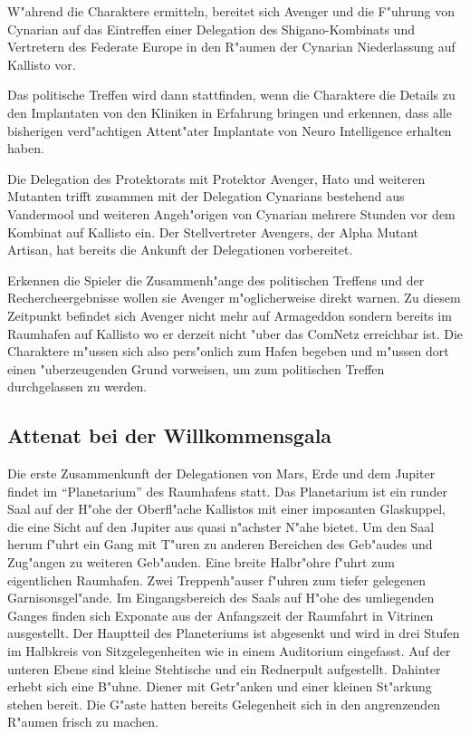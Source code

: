 W"ahrend die Charaktere ermitteln, bereitet sich Avenger und die F"uhrung von Cynarian auf das Eintreffen einer Delegation des Shigano-Kombinats und Vertretern des Federate Europe in den R"aumen der Cynarian Niederlassung auf Kallisto vor.

Das politische Treffen wird dann stattfinden, wenn die Charaktere die Details zu den Implantaten von den Kliniken in
Erfahrung bringen und erkennen, dass alle bisherigen verd"achtigen Attent"ater Implantate von Neuro Intelligence
erhalten haben.

Die Delegation des Protektorats mit Protektor Avenger, Hato und weiteren Mutanten trifft zusammen mit der Delegation Cynarians bestehend aus Vandermool und weiteren Angeh"origen von Cynarian mehrere Stunden vor dem Kombinat auf Kallisto
ein. Der Stellvertreter Avengers, der Alpha Mutant Artisan, hat bereits die Ankunft der Delegationen vorbereitet.

\begin{remarks}
Erkennen die Spieler die Zusammenh"ange des politischen Treffens und der Rechercheergebnisse wollen sie Avenger m"oglicherweise direkt warnen. Zu diesem Zeitpunkt befindet sich Avenger nicht mehr auf Armageddon sondern bereits im Raumhafen auf Kallisto wo er derzeit nicht "uber das ComNetz erreichbar ist. Die Charaktere m"ussen sich also pers"onlich zum Hafen begeben und m"ussen dort einen "uberzeugenden Grund vorweisen, um zum politischen Treffen durchgelassen zu werden.
\end{remarks}

\subsection{Attenat bei der Willkommensgala}

Die erste Zusammenkunft der Delegationen von Mars, Erde und dem Jupiter findet im "`Planetarium"' des Raumhafens statt. Das Planetarium ist ein runder Saal auf der H"ohe der Oberfl"ache Kallistos mit einer imposanten Glaskuppel, die eine Sicht auf den Jupiter aus quasi n"achster N"ahe bietet. Um den Saal herum f"uhrt ein Gang mit T"uren zu anderen Bereichen des Geb"audes und Zug"angen zu weiteren Geb"auden. Eine breite Halbr"ohre f"uhrt zum eigentlichen Raumhafen. Zwei Treppenh"auser f"uhren zum tiefer gelegenen Garnisonsgel"ande. Im Eingangsbereich des Saals auf H"ohe des umliegenden Ganges finden sich Exponate aus der Anfangszeit der Raumfahrt in Vitrinen ausgestellt. Der Hauptteil des Planeteriums ist abgesenkt und wird in drei Stufen im Halbkreis von Sitzgelegenheiten wie in einem Auditorium eingefasst. Auf der unteren Ebene sind kleine Stehtische und ein Rednerpult aufgestellt. Dahinter erhebt sich eine B"uhne. Diener mit Getr"anken und einer kleinen St"arkung stehen bereit. Die G"aste hatten bereits Gelegenheit sich in den angrenzenden R"aumen frisch zu machen.

